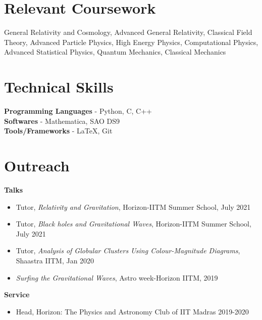\documentclass[margin, centered]{res}
\begin{document}
\begin{resume}
\section{Relevant Coursework}
General Relativity and Cosmology, Advanced General Relativity, Classical Field Theory, Advanced Particle Physics, High Energy Physics, Computational Physics, Advanced Statistical Physics, Quantum Mechanics, Classical Mechanics







\section{Technical \hspace{2mm} Skills}
\textbf{Programming Languages} - Python, C, C++\\
\textbf{Softwares} - Mathematica, SAO DS9 \\
\textbf{Tools/Frameworks} - \LaTeX, Git



\section{Outreach}

\textbf{Talks}
\begin{itemize}[leftmargin=*]
    \item Tutor, \textit{Relativity and Gravitation}, Horizon-IITM Summer School, July 2021
    \item Tutor, \textit{Black holes and Gravitational Waves}, Horizon-IITM Summer School, July 2021
    \item Tutor, \textit{Analysis of Globular Clusters Using
    Colour-Magnitude Diagrams}, Shaastra IITM, Jan 2020
    \item \textit{Surfing the Gravitational Waves}, Astro week-Horizon IITM, 2019
\end{itemize}

\textbf{Service}
\begin{itemize}[leftmargin=*]
    \item Head, Horizon: The Physics and Astronomy Club of IIT Madras \hfill 2019-2020\\
\end{itemize}






\end{resume}
\end{document}
